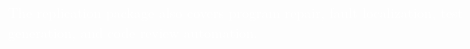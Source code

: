 

\visibleintro{} \textcolor{white}{The replication package also covers program repair, fault localization, test generation, and code review automation.}

\visibleresults

